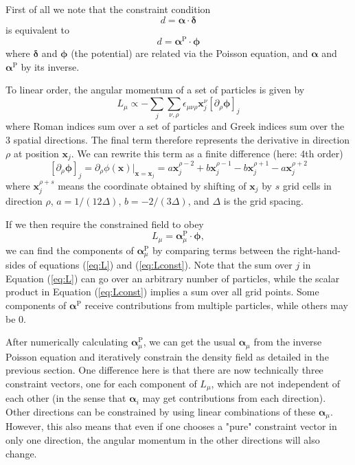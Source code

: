 \documentclass[11pt,a4paper,preprint]{aastex}
\newcommand{\bmath}[1]{\ensuremath{\bm{#1}}}
\renewcommand{\vec}[1]{\bmath{#1}}
\begin{document}
First of all we note that the constraint condition
\begin{equation}
d= \vec{\alpha} \cdot \vec{\delta}
\end{equation}
is equivalent to 
\begin{equation}
d= \vec{\alpha}^{\mathrm{P}} \cdot \vec{\phi}
\end{equation}
where $\vec{\delta}$ and $\vec{\phi}$ (the potential) are related via the Poisson equation, and $\vec{\alpha}$ and $\vec{\alpha}^{\mathrm{P}}$ by its inverse.

To linear order, the angular momentum of a set of particles is given by
\begin{equation}
L_{\mu} \propto - \sum_j \sum_{\nu, \rho} \epsilon_{\mu \nu \rho} \vec{x}_j^{\nu} \left[ \partial_{\rho} \vec{\phi} \right] _j
\label{eq:L}
\end{equation}
where Roman indices sum over a set of particles and Greek indices sum over the 3 spatial directions. The final term therefore represents the derivative in direction $\rho$ at position $\vec{x}_j$. We can rewrite this term as a finite difference (here: 4th order)
\begin{equation}
\left[ \partial_{\rho} \vec{\phi} \right] _j =  \partial_{\rho} \phi(\vec{x})|_{\vec{x}=\vec{x}_j} = a \vec{x}_j^{\rho-2} +b\vec{x}_j^{\rho-1} -b \vec{x}_j^{\rho+1} -a \vec{x}_j^{\rho+2}
\end{equation}
where $\vec{x}_j^{\rho+s}$ means the coordinate obtained by shifting of $\vec{x}_j$ by $s$ grid cells in direction $\rho$, $a=1/(12 \Delta) $, $b=-2/(3 \Delta)$, and $\Delta$ is the grid spacing.

If we then require the constrained field to obey
\begin{equation}
L_{\mu} = \vec{\alpha}_{\mu}^{\mathrm{P}} \cdot \vec{\phi},
\label{eq:Lconst}
\end{equation}
we can find the components of $\vec{\alpha}_{\mu}^{\mathrm{P}}$ by comparing terms between the right-hand-sides of equations (\ref{eq:L}) and (\ref{eq:Lconst}). Note that the sum over $j$ in Equation (\ref{eq:L}) can go over an arbitrary number of particles, while the scalar product in Equation (\ref{eq:Lconst}) implies a sum over all grid points. Some components of $\vec{\alpha}^{\mathrm{P}}$ receive contributions from multiple particles, while others may be 0.

After numerically calculating $\vec{\alpha}_{\mu}^{\mathrm{P}}$, we can get the usual $\vec{\alpha}_{\mu}$ from the inverse Poisson equation and iteratively constrain the density field as detailed in the previous section. 
One difference here is that there are now technically three constraint vectors, one for each component of $L_{\mu}$, which are not independent of each other (in the sense that $\vec{\alpha}_i$ may get contributions from each direction). Other directions can be constrained by using linear combinations of these $\vec{\alpha}_{\mu}$. However, this also means that even if one chooses a "pure" constraint vector in only one direction, the angular momentum in the other directions will also change.
\end{document}
